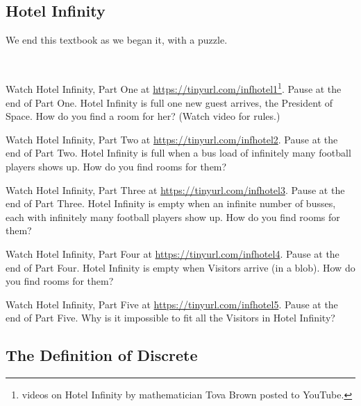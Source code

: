 
\newcommand{\subhotelinf}{Hotel Infinity}
\subsection{\subhotelinf}
\label{sub_hotel_infinity}

We end this textbook as we began it, with a puzzle.

\begin{act}
\label{act_hotel} 
~
    \begin{actpart}
        \item Watch Hotel Infinity, Part One at  \url{https://tinyurl.com/infhotel1}\footnote{videos on Hotel Infinity by mathematician Tova Brown posted to YouTube\texttrademark.}.  Pause at the end of Part One.  Hotel Infinity is full one new guest arrives, the President of Space. How do you find a room for her?  (Watch video for rules.)
        
        \item Watch Hotel Infinity, Part Two at \url{https://tinyurl.com/infhotel2}. Pause at the end of Part Two.  Hotel Infinity is full when a bus load of infinitely many football players shows up. How do you find rooms for them?

        \item Watch Hotel Infinity, Part Three at \url{https://tinyurl.com/infhotel3}. Pause at the end of Part Three.  Hotel Infinity is empty when an infinite number of busses, each with infinitely many football players show up.  How do you find rooms for them?

        \item Watch Hotel Infinity, Part Four at \url{https://tinyurl.com/infhotel4}. Pause at the end of Part Four.  Hotel Infinity is empty when Visitors arrive (in a blob).  How do you find rooms for them?

        \item Watch Hotel Infinity, Part Five at \url{https://tinyurl.com/infhotel5}. Pause at the end of Part Five. Why is it impossible to fit all the Visitors in Hotel Infinity?
    \end{actpart}
\end{act}




\newcommand{\subdefndiscrete}{The Definition of Discrete}
\subsection{\subdefndiscrete}
\label{sub_defn_discrete}

